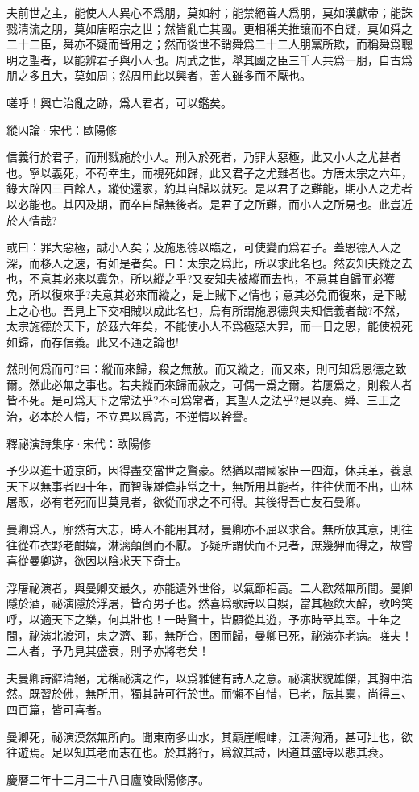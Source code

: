 \documentclass[12pt,a4paper]{ctexbook}
\begin{document}
夫前世之主，能使人人異心不爲朋，莫如紂；能禁絕善人爲朋，莫如漢獻帝；能誅戮清流之朋，莫如唐昭宗之世；然皆亂亡其國。更相稱美推讓而不自疑，莫如舜之二十二臣，舜亦不疑而皆用之；然而後世不誚舜爲二十二人朋黨所欺，而稱舜爲聰明之聖者，以能辨君子與小人也。周武之世，舉其國之臣三千人共爲一朋，自古爲朋之多且大，莫如周；然周用此以興者，善人雖多而不厭也。\par
嗟呼！興亡治亂之跡，爲人君者，可以鑑矣。\par
縱囚論·宋代：歐陽修 \par
信義行於君子，而刑戮施於小人。刑入於死者，乃罪大惡極，此又小人之尤甚者也。寧以義死，不苟幸生，而視死如歸，此又君子之尤難者也。方唐太宗之六年，錄大辟囚三百餘人，縱使還家，約其自歸以就死。是以君子之難能，期小人之尤者以必能也。其囚及期，而卒自歸無後者。是君子之所難，而小人之所易也。此豈近於人情哉?\par
或曰：罪大惡極，誠小人矣；及施恩德以臨之，可使變而爲君子。蓋恩德入人之深，而移人之速，有如是者矣。曰：太宗之爲此，所以求此名也。然安知夫縱之去也，不意其必來以冀免，所以縱之乎?又安知夫被縱而去也，不意其自歸而必獲免，所以復來乎?夫意其必來而縱之，是上賊下之情也；意其必免而復來，是下賊上之心也。吾見上下交相賊以成此名也，烏有所謂施恩德與夫知信義者哉?不然，太宗施德於天下，於茲六年矣，不能使小人不爲極惡大罪，而一日之恩，能使視死如歸，而存信義。此又不通之論也!\par
然則何爲而可?曰：縱而來歸，殺之無赦。而又縱之，而又來，則可知爲恩德之致爾。然此必無之事也。若夫縱而來歸而赦之，可偶一爲之爾。若屢爲之，則殺人者皆不死。是可爲天下之常法乎?不可爲常者，其聖人之法乎?是以堯、舜、三王之治，必本於人情，不立異以爲高，不逆情以幹譽。\par
釋祕演詩集序·宋代：歐陽修 \par
予少以進士遊京師，因得盡交當世之賢豪。然猶以謂國家臣一四海，休兵革，養息天下以無事者四十年，而智謀雄偉非常之士，無所用其能者，往往伏而不出，山林屠販，必有老死而世莫見者，欲從而求之不可得。其後得吾亡友石曼卿。\par
曼卿爲人，廓然有大志，時人不能用其材，曼卿亦不屈以求合。無所放其意，則往往從布衣野老酣嬉，淋漓顛倒而不厭。予疑所謂伏而不見者，庶幾狎而得之，故嘗喜從曼卿遊，欲因以陰求天下奇士。\par
浮屠祕演者，與曼卿交最久，亦能遺外世俗，以氣節相高。二人歡然無所間。曼卿隱於酒，祕演隱於浮屠，皆奇男子也。然喜爲歌詩以自娛，當其極飲大醉，歌吟笑呼，以適天下之樂，何其壯也！一時賢士，皆願從其遊，予亦時至其室。十年之間，祕演北渡河，東之濟、鄆，無所合，困而歸，曼卿已死，祕演亦老病。嗟夫！二人者，予乃見其盛衰，則予亦將老矣！\par
夫曼卿詩辭清絕，尤稱祕演之作，以爲雅健有詩人之意。祕演狀貌雄傑，其胸中浩然。既習於佛，無所用，獨其詩可行於世。而懶不自惜，已老，胠其橐，尚得三、四百篇，皆可喜者。\par
曼卿死，祕演漠然無所向。聞東南多山水，其巔崖崛峍，江濤洶涌，甚可壯也，欲往遊焉。足以知其老而志在也。於其將行，爲敘其詩，因道其盛時以悲其衰。\par
慶曆二年十二月二十八日廬陵歐陽修序。\par
\end{document}
